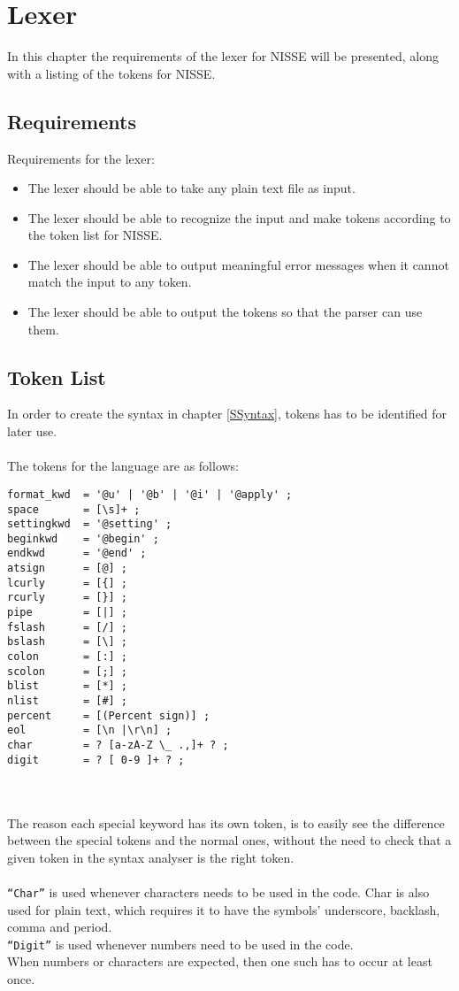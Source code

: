 \chapter{Lexer}
In this chapter the requirements of the lexer for NISSE will be presented, along with a listing of the tokens for NISSE.
\section{Requirements}
Requirements for the lexer:
\begin{itemize}
		\item The lexer should be able to take any plain text file as input.
		\item The lexer should be able to recognize the input and make tokens according to the token list for NISSE.
		\item The lexer should be able to output meaningful error messages when it cannot match the input to any token.
		\item The lexer should be able to output the tokens so that the parser can use them.
\end{itemize}

\newpage
\section{Token List}
In order to create the syntax in chapter \ref{SSyntax}, tokens has to be identified for later use.
\\ \\
The tokens for the language are as follows:

\begin{lstlisting}[frame=single]
format_kwd  = '@u' | '@b' | '@i' | '@apply' ;
space       = [\s]+ ;
settingkwd  = '@setting' ;
beginkwd    = '@begin' ;
endkwd      = '@end' ;
atsign      = [@] ;
lcurly      = [{] ;
rcurly      = [}] ;
pipe        = [|] ;
fslash      = [/] ;
bslash      = [\] ;
colon       = [:] ;
scolon      = [;] ;
blist       = [*] ;
nlist       = [#] ;
percent     = [(Percent sign)] ;
eol         = [\n |\r\n] ;
char        = ? [a-zA-Z \_ .,]+ ? ;
digit       = ? [ 0-9 ]+ ? ;
\end{lstlisting}

\\ \\
The reason each special keyword has its own token, is to easily see the difference between the special tokens and the normal ones, without the need to check that a given token in the syntax analyser is the right token.
\\ \\
\texttt{``Char''} is used whenever characters needs to be used in the code. Char is also used for plain text, which requires it to have the symbols' underscore, backlash, comma and period. \\
\texttt{``Digit''} is used whenever numbers need to be used in the code. \\
When numbers or characters are expected, then one such has to occur at least once.